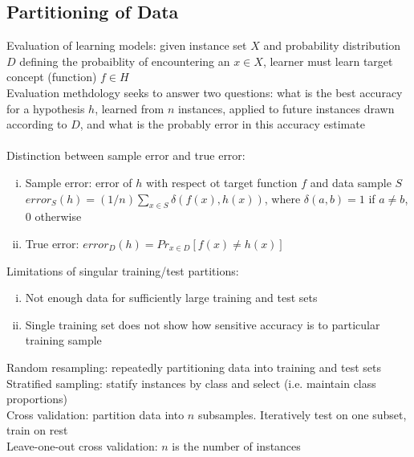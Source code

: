 \documentclass{article}
\begin{document}
		\subsection{Partitioning of Data}
			Evaluation of learning models: given instance set $X$ and probability distribution $D$ defining the probaiblity of encountering an $x \in X$, learner must learn target concept (function) $f \in H$ \\
			Evaluation methdology seeks to answer two questions: what is the best accuracy for a hypothesis $h$, learned from $n$ instances, applied to future instances drawn according to $D$, and what is the probably error in this accuracy estimate \\
			\\
			Distinction between sample error and true error:
			\begin{enumerate}[(i)]
				\item Sample error: error of $h$ with respect ot target function $f$ and data sample $S$ \\	
				$error_S(h) = (1/n)\sum_{x \in S} \delta(f(x), h(x))$, where $\delta(a, b) = 1$ if $a \neq b$, 0 otherwise
				\item True error: $error_D(h) = Pr_{x \in D} [f(x) \neq h(x)]$
				\end{enumerate}
			Limitations of singular training/test partitions: 
			\begin{enumerate}[(i)]
				\item Not enough data for sufficiently large training and test sets 
				\item Single training set does not show how sensitive accuracy is to particular training sample
				\end{enumerate}
			Random resampling: repeatedly partitioning data into training and test sets \\
			Stratified sampling: statify instances by class and select (i.e. maintain class proportions) \\
			Cross validation: partition data into $n$ subsamples. Iteratively test on one subset, train on rest \\
			Leave-one-out cross validation: $n$ is the number of instances 
\end{document}
